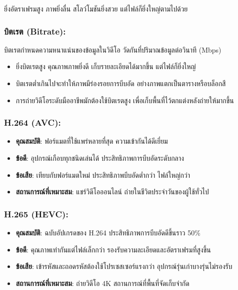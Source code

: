ยิ่งอัตราเฟรมสูง ภาพยิ่งลื่น สโลว์โมชันยิ่งสวย แต่ไฟล์ก็ยิ่งใหญ่ตามไปด้วย

\subsubsection*{บิตเรต (Bitrate):}

บิตเรตกำหนดความหนาแน่นของข้อมูลในวิดีโอ วัดกันที่ปริมาณข้อมูลต่อวินาที (Mbps)

\begin{itemize}
  \item ยิ่งบิตเรตสูง คุณภาพภาพยิ่งดี เก็บรายละเอียดได้มากขึ้น แต่ไฟล์ก็ยิ่งใหญ่
  \item บิตเรตต่ำเกินไปจะทำให้ภาพมีร่องรอยการบีบอัด อย่างภาพแตกเป็นตารางหรือบล็อกสี
  \item การถ่ายวิดีโอระดับมืออาชีพมักต้องใช้บิตเรตสูง เพื่อเก็บพื้นที่ไว้ตกแต่งหลังถ่ายให้มากขึ้น
\end{itemize}


\subsubsection*{H.264 (AVC):}

\begin{itemize}
  \item \textbf{คุณสมบัติ}: ฟอร์แมตที่ใช้แพร่หลายที่สุด ความเข้ากันได้ดีเยี่ยม
  \item \textbf{ข้อดี}: อุปกรณ์เกือบทุกชนิดเล่นได้ ประสิทธิภาพการบีบอัดระดับกลาง
  \item \textbf{ข้อเสีย}: เทียบกับฟอร์แมตใหม่ ประสิทธิภาพบีบอัดต่ำกว่า ไฟล์ใหญ่กว่า
  \item \textbf{สถานการณ์ที่เหมาะสม}: แชร์วิดีโอออนไลน์ ถ่ายในชีวิตประจำวันของผู้ใช้ทั่วไป
\end{itemize}

\subsubsection*{H.265 (HEVC):}

\begin{itemize}
  \item \textbf{คุณสมบัติ}: ฉบับอัปเกรดของ H.264 ประสิทธิภาพการบีบอัดดีขึ้นราว 50\%
  \item \textbf{ข้อดี}: คุณภาพเท่ากันแต่ไฟล์เล็กกว่า รองรับความละเอียดและอัตราเฟรมที่สูงขึ้น
  \item \textbf{ข้อเสีย}: เข้ารหัสและถอดรหัสต้องใช้โปรเซสเซอร์แรงกว่า อุปกรณ์รุ่นเก่าบางรุ่นไม่รองรับ
  \item \textbf{สถานการณ์ที่เหมาะสม}: ถ่ายวิดีโอ 4K สถานการณ์ที่พื้นที่จัดเก็บจำกัด
\end{itemize}

